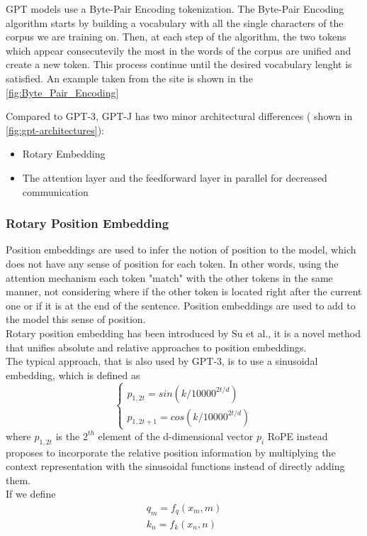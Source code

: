GPT models use a Byte-Pair Encoding tokenization. The Byte-Pair Encoding algorithm starts by building a vocabulary with all the single characters of the corpus we are training on. Then, at each step of the algorithm, the two tokens which appear consecutevily the most in the words of the corpus are unified and create a new token. This process continue until the desired vocabulary lenght is satisfied. An example taken from the site \cite{byte-pair-encoding} is shown in the \autoref{fig:Byte_Pair_Encoding}


Compared to GPT-3, GPT-J\cite{gptj} has two minor architectural differences  ( shown in \autoref{fig:gpt-architectures}):
\begin{itemize}
    \item Rotary Embedding
    \item The attention layer and the feedforward layer in parallel for decreased communication
\end{itemize}

\subsubsection{Rotary Position Embedding}
Position embeddings are used to infer the notion of position to the model, which does not have any sense of position for each token. In other words, using the attention mechanism each token "match" with the other tokens in the same manner, not considering where if the other token is located right after the current one or if it is at the end of the sentence. Position embeddings are used to add to the model this sense of position. \\ Rotary position embedding has been introduced by Su et al., it is a novel method that unifies absolute and relative approaches to position embeddings. \\
The typical approach, that is also used by GPT-3, is to use a sinusoidal embedding, which is defined as
\begin{equation*}
    \begin{cases}
        p_{1,2t} = sin(k/10000^{2t/d}) \\
        p_{1,2t+1} = cos(k/10000^{2t/d}) 
    \end{cases}
\end{equation*}
where $p_{1,2t}$ is the $2^{th}$ element of the d-dimensional vector $p_i$
RoPE instead proposes to incorporate the relative position information by multiplying the context representation with the sinusoidal functions instead of directly adding them. \\
If we define 
\begin{equation*}
    \begin{split}
        q_m = f_q(x_m, m) \\
        k_n = f_k(x_n, n) 
    \end{split}    
\end{equation*}

